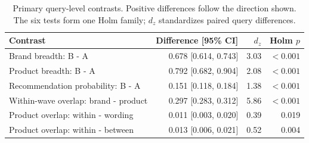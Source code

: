 \begin{table}[H]
\caption{Primary query-level contrasts. Positive differences follow the direction shown. The six tests form one Holm family; $d_z$ standardizes paired query differences.}\label{tab:contrasts}
\small
\begin{tabularx}{\textwidth}{Y r r r}
\toprule
Contrast & Difference [95\% CI] & $d_z$ & Holm $p$ \\
\midrule
Brand breadth: B - A & 0.678 [0.614, 0.743] & 3.03 & $<0.001$ \\
Product breadth: B - A & 0.792 [0.682, 0.904] & 2.08 & $<0.001$ \\
Recommendation probability: B - A & 0.151 [0.118, 0.184] & 1.38 & $<0.001$ \\
Within-wave overlap: brand - product & 0.297 [0.283, 0.312] & 5.86 & $<0.001$ \\
Product overlap: within - wording & 0.011 [0.003, 0.020] & 0.39 & 0.019 \\
Product overlap: within - between & 0.013 [0.006, 0.021] & 0.52 & 0.004 \\
\bottomrule
\end{tabularx}
\end{table}